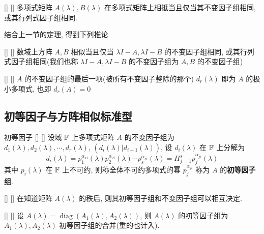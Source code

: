 \documentclass[UTF8]{ctexart}
\DeclareMathOperator{\0}{\mathbf{0}}
\DeclareMathOperator{\<}{\langle}
\renewcommand{\>}{\rangle}
\DeclareMathOperator{\diag}{diag}
\begin{document}
        \begin{thm}
			[]
			{}
			[]
			[]
            多项式矩阵 \(A(\lambda),B(\lambda)\) 在多项式矩阵上相抵当且仅当其不变因子组相同, 或其行列式因子组相同.
        \end{thm}
        结合上一节的定理, 得到下列推论
        \begin{crl}
			[]
			{}
			[]
			[]
            数域上方阵 \(A,B\) 相似当且仅当 \(\lambda I-A, \lambda I-B\) 的不变因子组相同, 或其行列式因子组相同(我们也称 \(\lambda I-A, \lambda I-B\) 的不变因子组为 \(A,B\) 的不变因子组)
        \end{crl}
        \begin{thm}
			[]
			{}
			[]
			[]
             \(A\) 的不变因子组的最后一项(被所有不变因子整除的那个) \(d_r(\lambda)\) 即为 \(A\) 的极小多项式, 也即 \(d_r(A)=0\) 
        \end{thm}
        
        
    \subsection{初等因子与方阵相似标准型}

        \begin{dfn}
			[]
			{初等因子}
			[]
			[]
            设域 \(\operatorname{\mathbb{F}}\) 上多项式矩阵 \(A\) 的不变因子组为 \(d_1(\lambda),d_2(\lambda),\cdots,d_r(\lambda)\),  \((d_i(\lambda)|d_{i+1}(\lambda))\), 设 \(d_i(\lambda)\) 在 \(\operatorname{\mathbb{F}}\) 上分解为
            \[d_i(\lambda)=p_1^{\alpha_{1i}}(\lambda)p_2^{\alpha_{2i}}(\lambda)\cdots p_s^{\alpha _{si}}(\lambda)=\Pi_{j=1}^sp_{j}^{\alpha_{ji}}(\lambda)\]
            其中 \(p_i(\lambda)\) 在 \(\operatorname{\mathbb{F}}\) 上不可约, 则称全体不可约多项式的幂 \(p_j^{\alpha_{ji}}\) 称为 \(A\) 的\textbf{初等因子组}.
        \end{dfn}

        \begin{lma}
			[]
			{}
			[]
			[]
            在知道矩阵 \(A(\lambda)\) 的秩后, 则其初等因子组和不变因子组可以相互决定.
        \end{lma}

        \begin{prf}
            
        \end{prf}

        \begin{lma}
			[]
			{}
			[]
			[]
            设 \(A(\lambda)=\diag(A_1(\lambda),A_2(\lambda))\), 则 \(A(\lambda)\) 的初等因子组为
             \(A_1(\lambda),A_2(\lambda)\) 初等因子组的合并(重的也计入).
        \end{lma}
\end{document}
